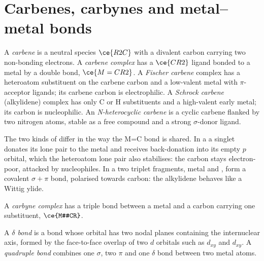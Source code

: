 \section{Carbenes, carbynes and metal--metal bonds}

\begin{definition}\label{def:b3:organometallic-bonding:carbene}
A \emph{carbene} is a neutral species $\ce{R2C}$ with a divalent carbon
carrying two non-bonding electrons. A \emph{carbene complex}
has a $\ce{CR2}$ ligand bonded to a metal by a double bond, $\ce{M=CR2}$. A
\emph{Fischer carbene} complex has a heteroatom substituent
on the carbene carbon and a low-valent metal with $\pi$-acceptor ligands; its carbene
carbon is electrophilic. A \emph{Schrock carbene} (alkylidene)
complex has only C or H substituents and a high-valent early metal; its carbon is
nucleophilic. An \emph{N-heterocyclic carbene} is a
cyclic carbene flanked by two nitrogen atoms, stable as a free compound and a strong
$\sigma$-donor ligand.
\end{definition}

The two kinds of  differ in the way the M=C bond is shared.
In a  a singlet  donates its lone pair to the metal and
receives back-donation into its empty $p$ orbital, which the heteroatom lone pair
also stabilises: the carbon stays electron-poor, attacked by nucleophiles. In a
 two triplet fragments, metal and , form a covalent $\sigma +
\pi$ bond, polarised towards carbon: the alkylidene behaves like a Wittig ylide.

\begin{definition}\label{def:b3:organometallic-bonding:carbyne}
A \emph{carbyne complex} has a triple bond between a metal
and a carbon carrying one substituent, $\ce{M#CR}$.
\end{definition}

\begin{definition}\label{def:b3:organometallic-bonding:delta}
A \emph{$\delta$ bond} is a bond whose orbital has two nodal planes
containing the internuclear axis, formed by the face-to-face overlap of two $d$
orbitals such as $d_{xy}$ and $d_{xy}$. A \emph{quadruple bond}
combines one $\sigma$, two $\pi$ and one $\delta$ bond between two metal atoms.
\end{definition}

